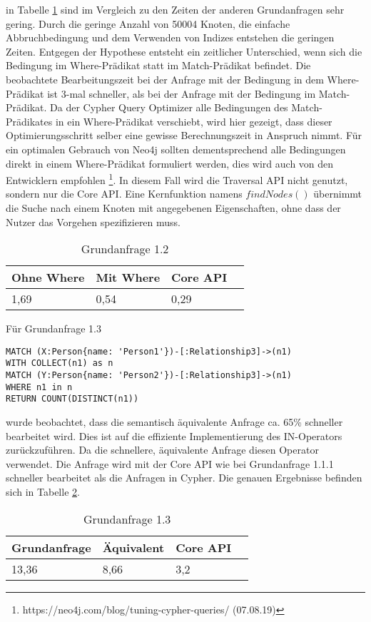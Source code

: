   in Tabelle \ref{tab:Query1_2} sind im Vergleich zu den Zeiten der anderen Grundanfragen sehr gering. Durch die geringe Anzahl von 50004 Knoten, die einfache Abbruchbedingung und dem Verwenden von Indizes entstehen die geringen Zeiten. \newline Entgegen der Hypothese entsteht ein zeitlicher Unterschied, wenn sich die Bedingung im Where-Prädikat statt im Match-Prädikat 	befindet. Die beobachtete Bearbeitungszeit bei der Anfrage mit der Bedingung in dem Where-Prädikat ist 3-mal schneller, als bei der Anfrage mit der Bedingung im Match-Prädikat. Da der Cypher Query Optimizer alle Bedingungen des Match-Prädikates in ein Where-Prädikat verschiebt, wird hier gezeigt, dass dieser Optimierungsschritt selber eine gewisse Berechnungszeit in Anspruch nimmt. Für ein optimalen Gebrauch von Neo4j sollten dementsprechend alle Bedingungen direkt in einem Where-Prädikat formuliert werden, dies wird auch von den Entwicklern empfohlen \footnote{https://neo4j.com/blog/tuning-cypher-queries/ (07.08.19)}. \newline
In diesem Fall wird die Traversal API nicht genutzt, sondern nur die Core API. Eine Kernfunktion namens $findNodes()$ übernimmt die Suche nach einem Knoten mit angegebenen Eigenschaften, ohne dass der Nutzer das Vorgehen spezifizieren muss.  
\FloatBarrier
\begin{table}[h]
	\centering
		\begin{tabular}{ |p{3cm}|p{3cm}|p{3cm}|p{3cm}|  }
			\hline
			Ohne Where& Mit Where& Core API  \\
			\hline
			1,69   &  0,54  & 0,29  \\
			\hline
		\end{tabular}
		\FloatBarrier
		\caption{Grundanfrage 1.2}
		\label{tab:Query1_2}
\end{table}
\FloatBarrier
\noindent Für Grundanfrage 1.3
\begin{Verbatim}[frame=single]
MATCH (X:Person{name: 'Person1'})-[:Relationship3]->(n1) 
WITH COLLECT(n1) as n 
MATCH (Y:Person{name: 'Person2'})-[:Relationship3]->(n1) 
WHERE n1 in n
RETURN COUNT(DISTINCT(n1))
\end{Verbatim} 
 wurde beobachtet, dass die semantisch äquivalente Anfrage ca. 65\% schneller bearbeitet wird. Dies ist auf die effiziente Implementierung des IN-Operators zurückzuführen. Da die schnellere, äquivalente Anfrage diesen Operator verwendet. Die Anfrage wird mit der Core API wie bei Grundanfrage 1.1.1 schneller bearbeitet als die Anfragen in Cypher.
Die genauen Ergebnisse befinden sich in Tabelle	\ref{tab:Query1_3}.
\FloatBarrier
\begin{table}[h]
	\centering
		\begin{tabular}{ |p{3cm}|p{3cm}|p{3cm}|p{3cm}|  }
			\hline
			Grundanfrage & Äquivalent&Core API\\
			\hline
			 13,36    & 8,66 &  3,2\\
			\hline
		\end{tabular}
		\caption{Grundanfrage 1.3}
		\label{tab:Query1_3}
\end{table}
\FloatBarrier

